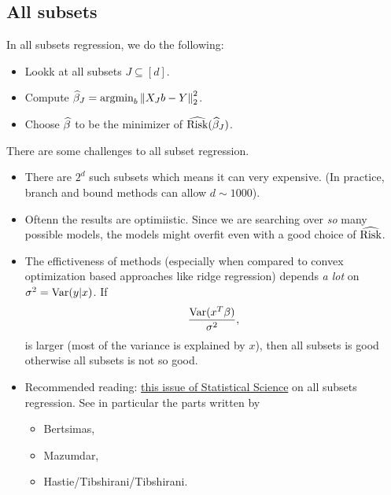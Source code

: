 \subsection{All subsets}
In all subsets regression, we do the following:
\begin{itemize}
    \item Lookk at all subsets $J \subseteq [d]$.
    \item Compute $\widehat{\beta}_J = \operatorname*{argmin}_b \left\|X_J b- Y\right\|_2^2$.
    \item Choose $\widehat{\beta}$ to be the minimizer of $\widehat{\text{Risk}}(\widehat{\beta}_J)$.
\end{itemize}
There are some challenges to all subset regression.
\begin{itemize}
    \item There are $2^d$ such subsets which means it can very expensive. (In practice, branch and bound methods can allow $d \sim 1000$).
    \item Oftenn the results are optimiistic. Since we are searching over \emph{so} many possible models, the models might overfit even with a good choice of $\widehat{\text{Risk}}$.
    \item The effictiveness of methods (especially when compared to convex optimization based approaches like ridge regression) depends \emph{a lot} on $\sigma^2 = \operatorname{Var}(y|x)$. If 
    \[ \frac{\operatorname{Var}(x^T\beta)}{\sigma^2},\]
    is larger (most of the variance is explained by $x$), then all subsets is good otherwise all subsets is not so good.
    \item Recommended reading: \href{https://projecteuclid.org/journals/statistical-science/volume-35/issue-4}{this issue of Statistical Science} on all subsets regression. See in particular the parts written by
    \begin{itemize}
        \item Bertsimas,
        \item Mazumdar,
        \item Hastie/Tibshirani/Tibshirani.
    \end{itemize}
\end{itemize}
